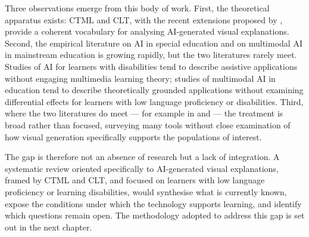 Three observations emerge from this body of work. First, the theoretical apparatus exists: CTML and CLT, with the recent extensions proposed by \citet{twabu2025}, provide a coherent vocabulary for analysing AI-generated visual explanations. Second, the empirical literature on AI in special education and on multimodal AI in mainstream education is growing rapidly, but the two literatures rarely meet. Studies of AI for learners with disabilities tend to describe assistive applications without engaging multimedia learning theory; studies of multimodal AI in education tend to describe theoretically grounded applications without examining differential effects for learners with low language proficiency or disabilities. Third, where the two literatures do meet --- for example in \citet{ahmad2025} and \citet{drosos2025} --- the treatment is broad rather than focused, surveying many tools without close examination of how visual generation specifically supports the populations of interest.

The gap is therefore not an absence of research but a lack of integration. A systematic review oriented specifically to AI-generated visual explanations, framed by CTML and CLT, and focused on learners with low language proficiency or learning disabilities, would synthesise what is currently known, expose the conditions under which the technology supports learning, and identify which questions remain open. The methodology adopted to address this gap is set out in the next chapter.
